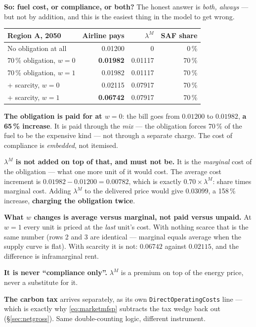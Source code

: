 \documentclass[11pt,a4paper]{article}
\newcommand{\var}[1]{\texttt{\small #1}}
\begin{document}
\begin{keybox}
\textbf{So: fuel cost, or compliance, or both?} The honest answer is \emph{both, always}
--- but not by addition, and this is the easiest thing in the model to get wrong.

\medskip
\begin{center}\small
\begin{tabular}{@{}lrrr@{}}
\toprule
\textbf{Region A, 2050} & \textbf{Airline pays} & $\lambda^{M}$ & \textbf{SAF share} \\
\midrule
No obligation at all & 0.01200 & 0 & 0\,\% \\
70\,\% obligation, $w=0$ & \textbf{0.01982} & 0.01117 & 70\,\% \\
70\,\% obligation, $w=1$ & 0.01982 & 0.01117 & 70\,\% \\
\;+ scarcity, $w=0$ & 0.02115 & 0.07917 & 70\,\% \\
\;+ scarcity, $w=1$ & \textbf{0.06742} & 0.07917 & 70\,\% \\
\bottomrule
\end{tabular}
\end{center}
\medskip

\textbf{The obligation is paid for at $w=0$}: the bill goes from $0.01200$ to
$0.01982$, \textbf{a 65\,\% increase}. It is paid through the \emph{mix} --- the
obligation forces 70\,\% of the fuel to be the expensive kind --- not through a separate
charge. The cost of compliance is \emph{embedded}, not itemised.

\textbf{$\lambda^{M}$ is not added on top of that, and must not be.} It is the
\emph{marginal} cost of the obligation --- what one more unit of it would cost. The
average cost increment is $0.01982-0.01200 = 0.00782$, which is exactly
$0.70 \times \lambda^{M}$: share times marginal cost. Adding $\lambda^{M}$ to the
delivered price would give $0.03099$, a 158\,\% increase, \textbf{charging the obligation
twice}.

\textbf{What $w$ changes is average versus marginal, not paid versus unpaid.} At $w=1$
every unit is priced at the \emph{last} unit's cost. With nothing scarce that is the same
number (rows 2 and 3 are identical --- marginal equals average when the supply curve is
flat). With scarcity it is not: $0.06742$ against $0.02115$, and the difference is
inframarginal rent.

\textbf{It is never ``compliance only''.} $\lambda^{M}$ is a premium on top of the energy
price, never a substitute for it.

\textbf{The carbon tax} arrives separately, as its own \var{DirectOperatingCosts} line
--- which is exactly why \eqref{eq:marketmfsp} subtracts the tax wedge back out
(\S\ref{sec:netgross}). Same double-counting logic, different instrument.
\end{keybox}
\end{document}
